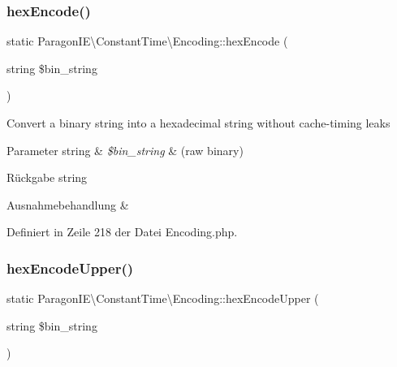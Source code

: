 \mbox{\label{class_paragon_i_e_1_1_constant_time_1_1_encoding_a19f0079c6c48e36314f1bf21cd61a88f}} 
\subsubsection{\texorpdfstring{hex\+Encode()}{hexEncode()}}
{\footnotesize\ttfamily static Paragon\+I\+E\textbackslash{}\+Constant\+Time\textbackslash{}\+Encoding\+::hex\+Encode (\begin{DoxyParamCaption}\item[{string}]{\$bin\+\_\+string }\end{DoxyParamCaption})\hspace{0.3cm}{\ttfamily [static]}}

Convert a binary string into a hexadecimal string without cache-\/timing leaks


\begin{DoxyParams}[1]{Parameter}
string & {\em \$bin\+\_\+string} & (raw binary) \\
\hline
\end{DoxyParams}
\begin{DoxyReturn}{Rückgabe}
string 
\end{DoxyReturn}

\begin{DoxyExceptions}{Ausnahmebehandlung}
{\em } & \\
\hline
\end{DoxyExceptions}


Definiert in Zeile 218 der Datei Encoding.\+php.

\mbox{\label{class_paragon_i_e_1_1_constant_time_1_1_encoding_aebea6f77ab5be7a3650d32a0aff047dd}} 
\subsubsection{\texorpdfstring{hex\+Encode\+Upper()}{hexEncodeUpper()}}
{\footnotesize\ttfamily static Paragon\+I\+E\textbackslash{}\+Constant\+Time\textbackslash{}\+Encoding\+::hex\+Encode\+Upper (\begin{DoxyParamCaption}\item[{string}]{\$bin\+\_\+string }\end{DoxyParamCaption})\hspace{0.3cm}{\ttfamily [static]}}

